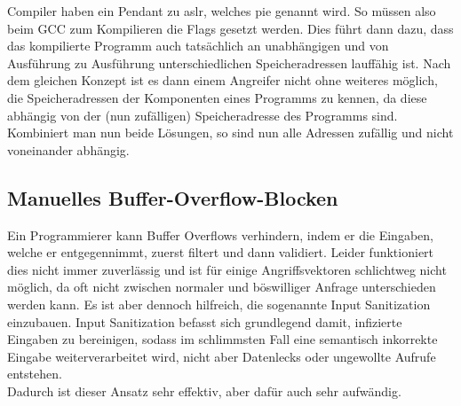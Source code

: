 Compiler haben ein Pendant zu \gls*{aslr}, welches \gls*{pie}
genannt wird. So müssen also beim GCC zum Kompilieren die Flags 
gesetzt werden. Dies führt dann dazu, dass das kompilierte Programm auch tatsächlich an
unabhängigen und von Ausführung zu Ausführung unterschiedlichen Speicheradressen lauffähig
ist.
Nach dem gleichen Konzept ist es dann einem Angreifer nicht ohne weiteres möglich, die
Speicheradressen der Komponenten eines Programms zu kennen, da diese abhängig
von der (nun zufälligen) Speicheradresse des Programms sind. Kombiniert man nun beide Lösungen,
so sind nun alle Adressen zufällig und nicht voneinander abhängig.

\subsection{Manuelles Buffer-Overflow-Blocken}
Ein Programmierer kann Buffer Overflows verhindern, indem er die Eingaben,
welche er entgegennimmt, zuerst filtert und dann validiert. Leider funktioniert
dies nicht immer zuverlässig und ist für einige Angriffsvektoren schlichtweg nicht
möglich, da oft nicht zwischen normaler und böswilliger Anfrage unterschieden werden kann. 
Es ist aber dennoch hilfreich, die sogenannte Input Sanitization einzubauen.
Input Sanitization befasst sich grundlegend damit, infizierte Eingaben zu bereinigen, 
sodass im schlimmsten Fall eine semantisch inkorrekte Eingabe weiterverarbeitet
wird, nicht aber Datenlecks oder ungewollte Aufrufe entstehen. \cite{sanitize} \\
Dadurch ist dieser Ansatz sehr effektiv, aber dafür auch sehr aufwändig.

